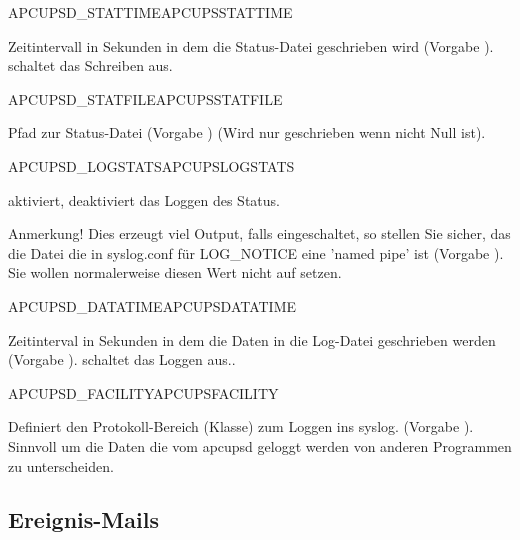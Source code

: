 \begin {description}

 {APCUPSD\_STATTIME}{APCUPSSTATTIME}
 
  Zeitintervall in Sekunden in dem die Status-Datei geschrieben wird 
  (Vorgabe ).  schaltet das Schreiben aus.


 {APCUPSD\_STATFILE}{APCUPSSTATFILE}
 
 Pfad zur Status-Datei (Vorgabe )
 (Wird nur geschrieben wenn  
 nicht Null ist).


 {APCUPSD\_LOGSTATS}{APCUPSLOGSTATS}

   aktiviert,  deaktiviert das Loggen des Status.
  
  Anmerkung! Dies erzeugt viel Output, falls eingeschaltet, so stellen Sie
  sicher, das die Datei die in syslog.conf für LOG\_NOTICE 
  eine 'named pipe' ist (Vorgabe ).
  Sie wollen normalerweise diesen Wert nicht auf  setzen.


 {APCUPSD\_DATATIME}{APCUPSDATATIME}
 
   Zeitinterval in Sekunden in dem die Daten in die Log-Datei geschrieben werden
   (Vorgabe ).  schaltet das Loggen aus..
   


 {APCUPSD\_FACILITY}{APCUPSFACILITY}
 
  Definiert den Protokoll-Bereich (Klasse) zum Loggen ins syslog. 
  (Vorgabe ).
  Sinnvoll um die Daten die vom apcupsd geloggt werden von anderen Programmen 
  zu unterscheiden.

\end {description}

\subsection{Ereignis-Mails}

